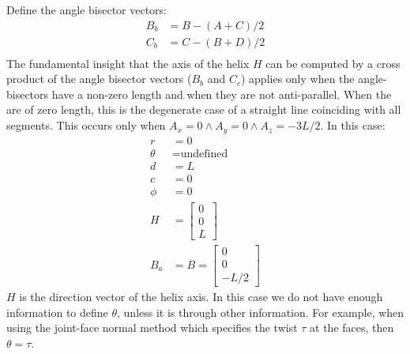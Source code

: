 \documentclass[11pt]{article}
\begin{document}
{Define the angle bisector vectors:
\begin{align}
  B_b &= B - (A + C)/2 \\
  C_b &= C - (B + D)/2 \\
  \end{align}
The fundamental insight that the axis of the helix $H$ can be
computed by a cross product of the angle bisector
vectors ($B_b$ and $C_c$) applies only
when the angle-bisectors have a non-zero length and when
they are not anti-parallel. When the are of zero length, this is
the degenerate case of a straight line coinciding with all segments.
This occurs only when $A_x = 0 \wedge A_y = 0 \wedge A_z = -3L/2$.
In this case:
\begin{align}
  r &= 0 \\
  \theta &= \text{undefined}\\
  d &= L \\
  c &= 0 \\
  \phi &= 0 \\
  H &=  \begin{bmatrix} 0 \\ 0 \\ L  \end{bmatrix} \\
  B_a &= B = \begin{bmatrix} 0 \\ 0 \\ -L/2  \end{bmatrix}
\end{align}
$H$ is the direction vector of the helix axis.
In this case we do not have enough information to define $\theta$,
unless it is through other information. For example, when using
the joint-face normal method which specifies
the twist $\tau$ at the faces, then $\theta = \tau$.

}
\end{document}
